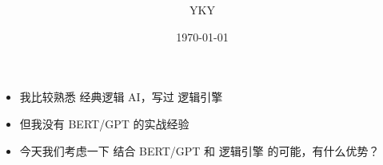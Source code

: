 

\usepackage{color}
\usepackage{mathtools}
\usepackage{hyperref}

%

\usepackage{graphicx} %
\usepackage{tikz-cd}
\usepackage{tikz}
\usepackage[export]{adjustbox}%
\usepackage{verbatim} %


\newcommand{\underdash}[1]{%
	\tikz[baseline=(toUnderline.base)]{
		\node[inner sep=1pt,outer sep=10pt] (toUnderline) {#1};
		\draw[dashed] ([yshift=-0pt]toUnderline.south west) -- ([yshift=-0pt]toUnderline.south east);
	}%
}%


\newcommand{\highlight}[1]{\colorbox{pink}{$\displaystyle #1$}}

\newcommand{\emp}[1]{{\color{blue}\textbf{#1}}}
\newcommand*\confoundFace{$\vcenter{\hbox{\texttt{[image: ../2020/../confounded-face.jpg]}}}$}
\newcommand{\underconst}{\texttt{[image: ../2020/UnderConst.png]}}
\newcommand{\witness}{\scalebox{0.6}{$\blacksquare$}}
\providecommand\Heytingarrow{\relbar\joinrel\mathrel{\vcenter{\hbox{\scalebox{0.75}{$\rhd$}}}}}



\title{\bfseries\color{blue}{\Huge《BERT 与逻辑的结合》}}
\author{YKY} %
\date{\today} %

\maketitle
{}

\begin{itemize}
	\item 我比较熟悉 经典逻辑 AI，写过 逻辑引擎
	\item 但我没有 BERT/GPT 的实战经验
	\item 今天我们考虑一下 结合 BERT/GPT 和 逻辑引擎 的可能，有什么优势？ 
\end{itemize}

